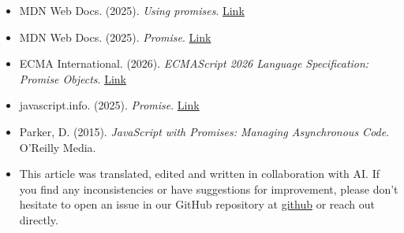\begin{itemize}
    \item MDN Web Docs. (2025). \textit{Using promises}. \href{https://developer.mozilla.org/en-US/docs/Web/JavaScript/Guide/Using_promises}{Link}
    
    \item MDN Web Docs. (2025). \textit{Promise}. \href{https://developer.mozilla.org/en-US/docs/Web/JavaScript/Reference/Global_Objects/Promise}{Link}
    
    \item ECMA International. (2026). \textit{ECMAScript 2026 Language Specification: Promise Objects}. \href{https://tc39.es/ecma262/multipage/control-abstraction-objects.html#sec-promise-objects}{Link}
    
    \item javascript.info. (2025). \textit{Promise}. \href{https://javascript.info/promise-basics}{Link}
    
    \item Parker, D. (2015). \textit{JavaScript with Promises: Managing Asynchronous Code}. O'Reilly Media.

    \item This article was translated, edited and written in collaboration with AI. If you find any inconsistencies or have suggestions for improvement, please don't hesitate to open an issue in our GitHub repository at \href{https://github.com/asanchezyali/social-media-posts}{github} or reach out directly.
\end{itemize}


